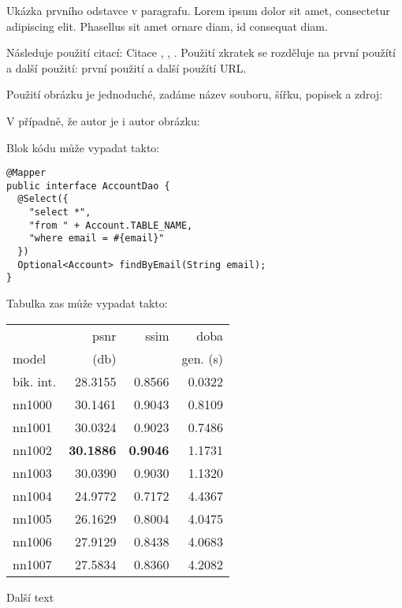 			\noindent Ukázka prvního odstavce v paragrafu. Lorem ipsum dolor sit amet, consectetur adipiscing elit. Phasellus sit amet ornare diam, id consequat diam.

			Následuje použití citací: Citace \cite{html_hypertext_markup_language}, \cite{hibernate_docs}, \cite{ddd_quickly}.
			Použití zkratek se rozděluje na první použítí a další použití: první použití  a další použítí \ac{URL}.

			Použití obrázku je jednoduché, zadáme název souboru, šířku, popisek a zdroj:


			V případně, že autor je i autor obrázku:


			Blok kódu může vypadat takto:

			\begin{codeblock}
				\begin{verbatim}
@Mapper
public interface AccountDao {
  @Select({
    "select *",
    "from " + Account.TABLE_NAME,
    "where email = #{email}"
  })
  Optional<Account> findByEmail(String email);
}
				\end{verbatim}
			\end{codeblock}

			Tabulka zas může vypadat takto:

			\begin{table}[hbt!]
				\centering
				\begin{tabular}{| l | r | r | r | }
					\hline
					&        psnr &      ssim &      doba  \\
					model &       (db)    &           & gen. (s) \\
					\hline
					bik. int. & 28.3155 & 0.8566 & 0.0322 \\
					nn1000    & 30.1461 & 0.9043 & 0.8109 \\
					nn1001    & 30.0324 & 0.9023 & 0.7486 \\
					nn1002    & \textbf{30.1886} & \textbf{0.9046} & 1.1731 \\
					nn1003    & 30.0390 & 0.9030 & 1.1320 \\
					nn1004    & 24.9772 & 0.7172 & 4.4367 \\
					nn1005    & 26.1629 & 0.8004 & 4.0475 \\
					nn1006    & 27.9129 & 0.8438 & 4.0683 \\
					nn1007    & 27.5834 & 0.8360 & 4.2082 \\
					\hline
				\end{tabular}
			\end{table}

			\newpage

			Další text


